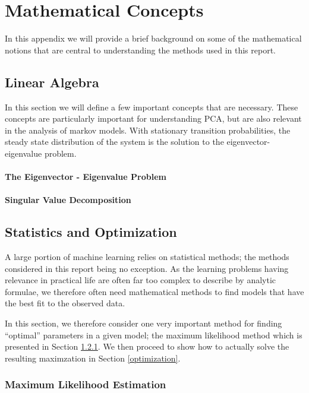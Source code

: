 \documentclass[11pt, oneside, a4paper]{report}
\begin{document}
\appendix
\chapter{Mathematical Concepts}

In this appendix we will provide a brief background on some of the mathematical notions that are central to understanding the methods used in this report. 

\section{Linear Algebra}

In this section we will define a few important concepts that are
necessary. These concepts are particularly important for understanding
PCA, but are also relevant in the analysis of markov models. With
stationary transition probabilities, the steady state distribution of
the system is the solution to the eigenvector-eigenvalue problem.

\subsubsection{The Eigenvector - Eigenvalue Problem}

\subsubsection{Singular Value Decomposition}


\section{Statistics and Optimization}

A large portion of machine learning relies on statistical
methods; the methods considered in this report being no exception. As the learning problems having relevance in practical life are often
far too complex to describe by analytic formulae, we therefore often
need mathematical methods to find models that have the best fit to the
observed data. 

In this section, we therefore consider one very
important method for finding ``optimal'' parameters in a given model;
the maximum likelihood method which is presented in Section
\ref{ml-estimation}. We then proceed to show how to actually solve
the resulting maximzation in Section \ref{optimization}.


\subsection{Maximum Likelihood Estimation}\label{ml-estimation}
\end{document}
